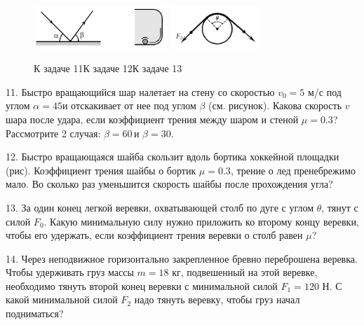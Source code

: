 \documentclass[14pt]{article}
\begin{document}
\begin{figure}[h]
\begin{center}
\includegraphics[width=0.45\textwidth]{friction7.png}
\hspace{1cm}
\includegraphics[width=0.3\textwidth]{friction8.png}
\caption{\hspace{-0.3cm}К задаче 11\hspace{2.8cm}К задаче 12\hspace{3.3cm}К задаче 13}
\end{center}
\end{figure}

11. Быстро вращающийся шар налетает на стену со скоростью $v_0=5$ м/с под углом $\alpha=45$\textdegree\;и отскакивает от нее под углом $\beta$ (см. рисунок). Какова скорость $v$ шара после удара, если коэффициент трения между шаром и стеной $\mu=0.3$? Рассмотрите 2 случая: $\beta=60$\textdegree\,и $\beta=30$\textdegree.

12. Быстро вращающаяся шайба скользит вдоль бортика хоккейной площадки (рис). Коэффициент трения шайбы о бортик $\mu=0.3$, трение о лед пренебрежимо мало. Во сколько раз уменьшится скорость шайбы после прохождения угла?

13. За один конец легкой веревки, охватывающей столб по дуге с углом $\theta$, тянут с силой $F_0$. Какую минимальную силу нужно приложить ко второму концу веревки, чтобы его удержать, если коэффициент трения веревки о столб равен $\mu$?

14. Через неподвижное горизонтально закрепленное бревно переброшена веревка. Чтобы удерживать груз массы $m=18$ кг, подвешенный на этой веревке, необходимо тянуть второй конец веревки с минимальной силой $F_1=120$ Н. С какой минимальной силой $F_2$ надо тянуть веревку, чтобы груз начал подниматься?
\end{document}

